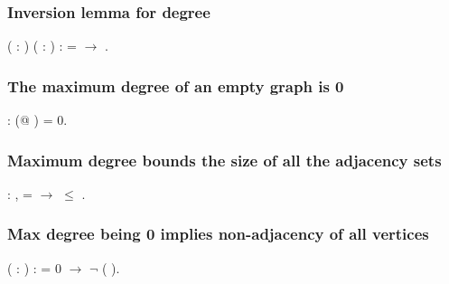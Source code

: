 \subsubsection{Inversion lemma for degree}


\begin{coqdoccode}
\coqdocemptyline
\coqdocnoindent
{}  ( : ) ( : )  :\coqdoceol
\coqdocindent{1.00em}
   =   \ensuremath{\rightarrow}   .\coqdoceol
\coqdocemptyline
\end{coqdoccode}
\subsubsection{The maximum degree of an empty graph is 0}


\begin{coqdoccode}
\coqdocemptyline
\coqdocnoindent
{}  :  (@ \coqdocvar{\_}) = 0.\coqdoceol
 \coqdocemptyline
\end{coqdoccode}
\subsubsection{Maximum degree bounds the size of all the adjacency sets}


\begin{coqdoccode}
\coqdocemptyline
\coqdocnoindent
{}  : \coqdockw{\ensuremath{\forall}}   ,    =   \ensuremath{\rightarrow}   \ensuremath{\le}  .\coqdoceol
\coqdocemptyline
\end{coqdoccode}
\subsubsection{Max degree being 0 implies non-adjacency of all vertices}


\begin{coqdoccode}
\coqdocemptyline
\coqdocnoindent
{}  ( : )   :   = 0 \ensuremath{\rightarrow} \ensuremath{\lnot}   (  ).\coqdoceol
\coqdocemptyline
\end{coqdoccode}
